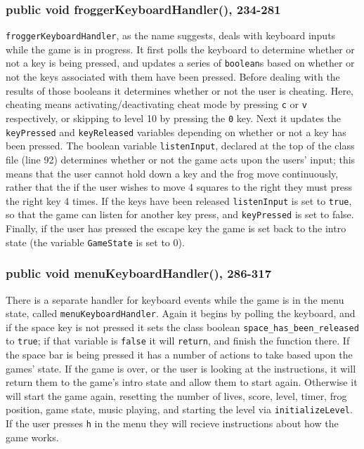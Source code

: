 \documentclass[12pt]{article}
\begin{document}
\subsubsection{public void froggerKeyboardHandler(), 234-281}
\verb|froggerKeyboardHandler|, as the name suggests, deals with keyboard inputs while the game is in progress.
It first polls the keyboard to determine whether or not a key is being pressed, and updates a series of \verb|boolean|s based on whether or not the keys associated with them have been pressed.
Before dealing with the results of those booleans it determines whether or not the user is cheating.
Here, cheating means activating/deactivating cheat mode by pressing \verb|c| or \verb|v| respectively, or skipping to level 10 by pressing the \verb|0| key.
Next it updates the \verb|keyPressed| and \verb|keyReleased| variables depending on whether or not a key has been pressed.
The boolean variable \verb|listenInput|, declared at the top of the class file (line 92) determines whether or not the game acts upon the users' input; this means that the user cannot hold down a key and the frog move continuously, rather that the if the user wishes to move 4 squares to the right they must press the right key 4 times.
If the keys have been released \verb|listenInput| is set to \verb|true|, so that the game can listen for another key press, and \verb|keyPressed| is set to false.
Finally, if the user has pressed the escape key the game is set back to the intro state (the variable \verb|GameState| is set to 0).

\subsubsection{public void menuKeyboardHandler(), 286-317}
There is a separate handler for keyboard events while the game is in the menu state, called \verb|menuKeyboardHandler|.
Again it begins by polling the keyboard, and if the space key is not pressed it sets the class boolean \verb|space_has_been_released| to \verb|true|; if that variable is \verb|false| it will \verb|return|, and finish the function there.
If the space bar is being pressed it has a number of actions to take based upon the games' state.
If the game is over, or the user is looking at the instructions, it will return them to the game's intro state and allow them to start again.
Otherwise it will start the game again, resetting the number of lives, score, level, timer, frog position, game state, music playing, and starting the level via \verb|initializeLevel|.
If the user presses \verb|h| in the menu they will recieve instructions about how the game works.
\end{document}
